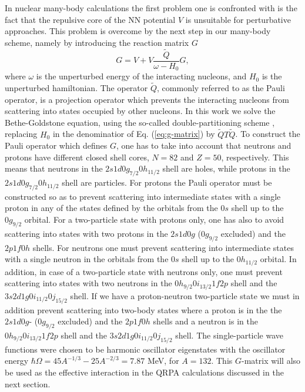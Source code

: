 In nuclear many-body calculations the first problem one is
confronted with is the fact that the repulsive core of the NN potential $V$
is unsuitable for perturbative approaches. This problem is overcome by 
the next
step in our many-body scheme, namely 
by introducing the reaction matrix $G$
\begin{equation}
    G=V+V\frac{\tilde{Q}}{\omega - H_0}G,
     \label{eq:g-matrix}
\end{equation}
where $\omega$ is the unperturbed energy of the interacting nucleons,
and $H_0$ is the unperturbed hamiltonian. 
The operator $\tilde{Q}$, commonly referred to
as the Pauli operator, is a projection operator which prevents the
interacting nucleons from scattering into states occupied by other nucleons.
In this work we solve the Bethe-Goldstone equation, using the so-called 
double-partitioning 
scheme \cite{hko95}, replacing $H_{0}$ in the denominatior 
of  Eq. (\ref{eq:g-matrix}) by $\tilde{Q} T \tilde{Q}$. 
To construct the Pauli operator which defines $G$, one has to take 
into account that neutrons and protons have different closed shell
cores, $N=82$ and $Z=50$, respectively.
This means that neutrons in the $2s1d0g_{7/2}0h_{11/2}$ shell
are holes, while protons in the $2s1d0g_{7/2}0h_{11/2}$ shell
are particles. For protons the  Pauli operator must be constructed so as to
prevent scattering into intermediate states with a single
proton in any of the
states defined by the orbitals from the $0s$ shell up to the
$0g_{9/2}$ orbital. For a two-particle state with protons only, one has 
also to avoid scattering 
into states with two protons in the $2s1d0g$ ($0g_{9/2}$ excluded)
and the $2p1f0h$ shells. For neutrons one must
prevent scattering into intermediate states with a single neutron
in the orbitals from the $0s$ shell up to the
$0h_{11/2}$ orbital. In addition, in case of a two-particle
state with neutrons only, one must prevent scattering into states
with two neutrons in the $0h_{9/2}0i_{13/2}1f2p$ shell
and the $3s2d1g0i_{11/2}0j_{15/2}$ shell. 
If we have a proton-neutron two-particle state we must in addition prevent
scattering into two-body states where a proton is in the 
the $2s1d0g$- ($0g_{9/2}$ excluded)
and the $2p1f0h$ shells and a neutron is in the 
$0h_{9/2}0i_{13/2}1f2p$ shell
and the $3s2d1g0i_{11/2}0j_{15/2}$ shell.
The single-particle wave functions were chosen to be harmonic oscillator 
eigenstates with the oscillator energy 
$\hbar\Omega = 45A^{-1/3} - 25A^{-2/3}=7.87 $ MeV,  for $A=132$.
This $G$-matrix will also be used as the effective
interaction in the QRPA calculations discussed
in the next section. 

